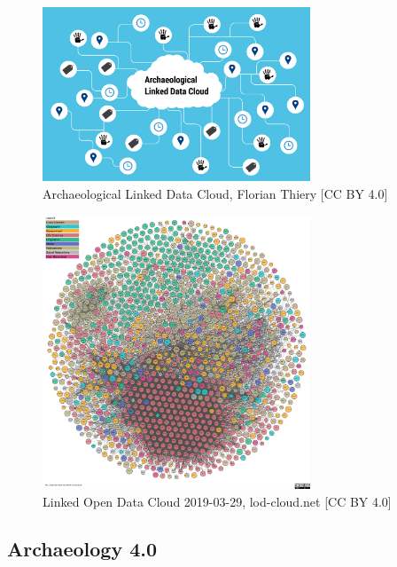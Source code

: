 \documentclass[twocolumn]{autart}
\begin{document}
\begin{figure}[!htb]
\begin{center}
\includegraphics[width=8cm]{Archaeological_Linked_Data_Cloud_(ALDC).png}    %
\caption{Archaeological Linked Data Cloud, Florian Thiery [CC BY 4.0]}  %
\label{figaaldc}                                 %
\end{center}                                 %
\end{figure}

\begin{figure}[!htb]
\begin{center}
\includegraphics[width=8cm]{lod-cloud.pdf}    %
\caption{Linked Open Data Cloud 2019-03-29, lod-cloud.net [CC BY 4.0]}  %
\label{figlodc}                                 %
\end{center}                                 %
\end{figure}

\subsection{Archaeology 4.0}
\end{document}
